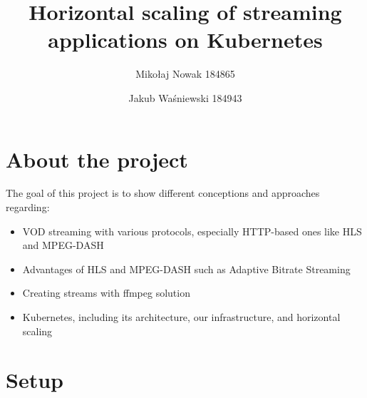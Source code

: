 \documentclass{article}
\title{Horizontal scaling of streaming applications on Kubernetes}
\author{Mikołaj Nowak 184865 \and Jakub Waśniewski 184943}
\date{}
\begin{document}
\maketitle

\section{About the project}\label{about-the-project}

The goal of this project is to show different conceptions and approaches regarding:
\begin{itemize}
  \item VOD streaming with various protocols, especially HTTP-based ones like HLS and MPEG-DASH
  \item Advantages of HLS and MPEG-DASH such as Adaptive Bitrate Streaming
  \item Creating streams with ffmpeg solution
  \item Kubernetes, including its architecture, our infrastructure, and horizontal scaling
\end{itemize}

\section{Setup}\label{setup}
\end{document}
